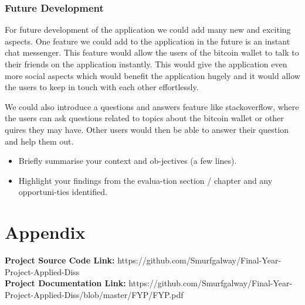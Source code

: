 \subsection{Future Development}
For future development of the application we could add many new and exciting aspects. One feature we could add to the application in the future is an instant chat messenger. This feature would allow the users of the bitcoin wallet to talk to their friends on the application instantly. This would give the application even more social aspects which would benefit the application hugely and it would allow the users to keep in touch with each other effortlessly.
\par We could also introduce a questions and answers feature like stackoverflow, where the users can ask questions related to topics about the bitcoin wallet or other quires they may have. Other users would then be able to answer their question and help them out.

\begin{itemize}
\item Briefly summarise your context and ob-jectives (a few lines).
\item Highlight your findings from the evalua-tion section / chapter and any opportuni-ties identified.
\end{itemize}

\chapter{Appendix}
\textbf{Project Source Code Link: } https://github.com/Smurfgalway/Final-Year-Project-Applied-Diss \\
\textbf{Project Documentation Link: } https://github.com/Smurfgalway/Final-Year-Project-Applied-Diss/blob/master/FYP/FYP.pdf\\